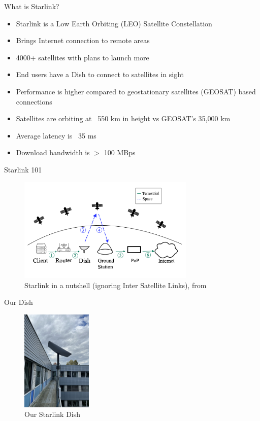 \documentclass[NET,english,beameralt]{tumbeamer}
\begin{document}
\begin{frame}{What is Starlink?}
    \begin{itemize}
        \item Starlink is a Low Earth Orbiting (LEO) Satellite Constellation
        \item Brings Internet connection to remote areas 
        \item 4000+ satellites with plans to launch more
        \item End users have a Dish to connect to satellites in sight
        \item Performance is higher compared to geostationary satellites (GEOSAT) based connections
        \item Satellites are orbiting at ~550 km in height vs GEOSAT's 35,000 km
        \item Average latency is ~35 ms
        \item Download bandwidth is $>$ 100 MBps
    \end{itemize}
\end{frame}

\begin{frame}{Starlink 101}
    \begin{figure}
        \includegraphics[width=0.75\textwidth]{pics/starlink-101.png}
        \caption{Starlink in a nutshell (ignoring Inter Satellite Links), from \cite{izhikevich2023democratizing}}
    \end{figure}
\end{frame}

\begin{frame}{Our Dish}
    \begin{figure}
        \includegraphics[width=0.3\textwidth]{pics/dish.jpeg}
        \caption{Our Starlink Dish}
    \end{figure}
\end{frame}
\end{document}
